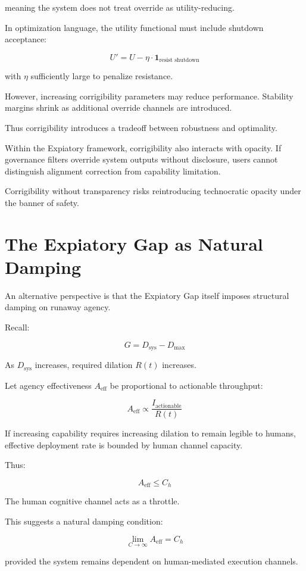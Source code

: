 \documentclass[12pt]{article}
\begin{document}
meaning the system does not treat override as utility-reducing.

In optimization language, the utility functional must include shutdown acceptance:

\[
U' = U - \eta \cdot \mathbf{1}_{\text{resist shutdown}}
\]

with $\eta$ sufficiently large to penalize resistance.

However, increasing corrigibility parameters may reduce performance. Stability margins shrink as additional override channels are introduced.

Thus corrigibility introduces a tradeoff between robustness and optimality.

Within the Expiatory framework, corrigibility also interacts with opacity. If governance filters override system outputs without disclosure, users cannot distinguish alignment correction from capability limitation.

Corrigibility without transparency risks reintroducing technocratic opacity under the banner of safety.

\section{The Expiatory Gap as Natural Damping}

An alternative perspective is that the Expiatory Gap itself imposes structural damping on runaway agency.

Recall:

\[
G = D_{\text{sys}} - D_{\max}
\]

As $D_{\text{sys}}$ increases, required dilation $R(t)$ increases.

Let agency effectiveness $A_{\text{eff}}$ be proportional to actionable throughput:

\[
A_{\text{eff}} \propto \frac{I_{\text{actionable}}}{R(t)}
\]

If increasing capability requires increasing dilation to remain legible to humans, effective deployment rate is bounded by human channel capacity.

Thus:

\[
A_{\text{eff}} \le C_h
\]

The human cognitive channel acts as a throttle.

This suggests a natural damping condition:

\[
\lim_{C \to \infty} A_{\text{eff}} = C_h
\]

provided the system remains dependent on human-mediated execution channels.
\end{document}
